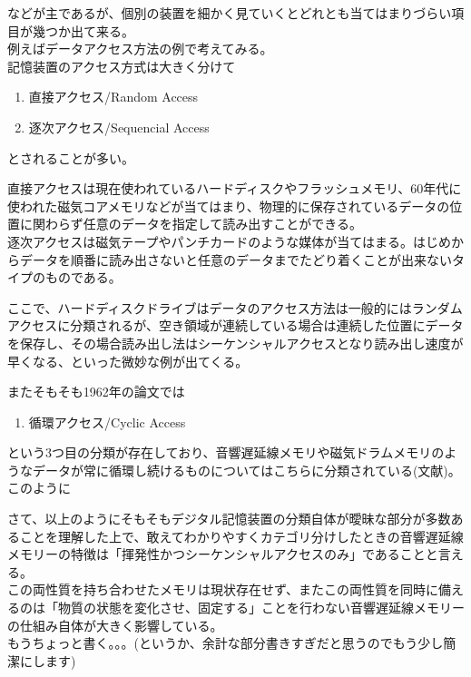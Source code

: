 などが主であるが、個別の装置を細かく見ていくとどれとも当てはまりづらい項目が幾つか出て来る。\\
例えばデータアクセス方法の例で考えてみる。\\
記憶装置のアクセス方式は大きく分けて

\begin{enumerate}
\def\labelenumi{\arabic{enumi}.}
\tightlist
\item
  直接アクセス/Random Access
\item
  逐次アクセス/Sequencial Access
\end{enumerate}

とされることが多い。

直接アクセスは現在使われているハードディスクやフラッシュメモリ、60年代に使われた磁気コアメモリなどが当てはまり、物理的に保存されているデータの位置に関わらず任意のデータを指定して読み出すことができる。\\
逐次アクセスは磁気テープやパンチカードのような媒体が当てはまる。はじめからデータを順番に読み出さないと任意のデータまでたどり着くことが出来ないタイプのものである。

ここで、ハードディスクドライブはデータのアクセス方法は一般的にはランダムアクセスに分類されるが、空き領域が連続している場合は連続した位置にデータを保存し、その場合読み出し法はシーケンシャルアクセスとなり読み出し速度が早くなる、といった微妙な例が出てくる。

またそもそも1962年の論文では

\begin{enumerate}
\def\labelenumi{\arabic{enumi}.}
\tightlist
\item
  循環アクセス/Cyclic Access
\end{enumerate}

という3つ目の分類が存在しており、音響遅延線メモリや磁気ドラムメモリのようなデータが常に循環し続けるものについてはこちらに分類されている(文献)。このように

さて、以上のようにそもそもデジタル記憶装置の分類自体が曖昧な部分が多数あることを理解した上で、敢えてわかりやすくカテゴリ分けしたときの音響遅延線メモリーの特徴は「揮発性かつシーケンシャルアクセスのみ」であることと言える。\\
この両性質を持ち合わせたメモリは現状存在せず、またこの両性質を同時に備えるのは「物質の状態を変化させ、固定する」ことを行わない音響遅延線メモリーの仕組み自体が大きく影響している。\\
もうちょっと書く。。。(というか、余計な部分書きすぎだと思うのでもう少し簡潔にします)


